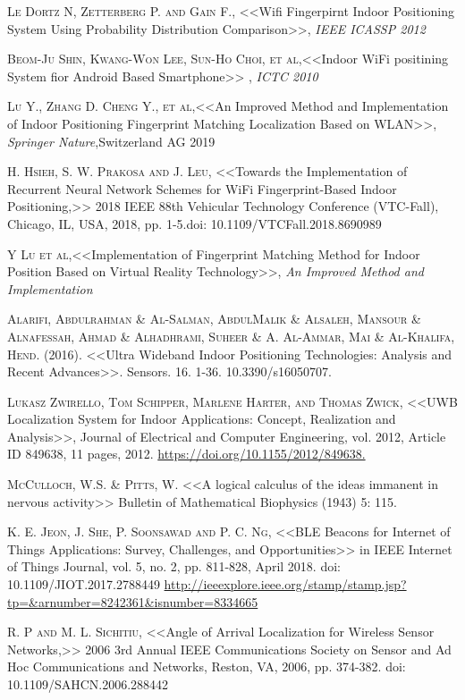\documentclass[12pt]{report}
\begin{document}
\begin{thebibliography}{X}
 \textsc{Le Dortz N, Zetterberg P. and Gain F.}, <<Wifi Fingerpirnt Indoor Positioning System Using Probability Distribution Comparison>>, \textit{IEEE ICASSP 2012}

 \textsc{Beom-Ju Shin, Kwang-Won Lee, Sun-Ho Choi, et al},<<Indoor WiFi positining System fior Android Based Smartphone>> , \textit{ICTC 2010}

 \textsc{Lu Y., Zhang D. Cheng Y., et al},<<An Improved Method and Implementation of Indoor Positioning Fingerprint Matching Localization Based on WLAN>>, \textit{Springer Nature},Switzerland AG 2019

\textsc{H. Hsieh, S. W. Prakosa and J. Leu}, <<Towards the Implementation of Recurrent Neural Network Schemes for WiFi Fingerprint-Based Indoor Positioning,>> 2018 IEEE 88th Vehicular Technology Conference (VTC-Fall), Chicago, IL, USA, 2018, pp. 1-5.doi: 10.1109/VTCFall.2018.8690989

 \textsc{Y Lu et al},<<Implementation of Fingerprint Matching Method for Indoor Position Based on Virtual Reality Technology>>, \textit{An Improved Method and Implementation}

 \textsc{Alarifi, Abdulrahman \& Al-Salman, AbdulMalik \& Alsaleh, Mansour \& Alnafessah, Ahmad \& Alhadhrami, Suheer \& A. Al-Ammar, Mai \& Al-Khalifa, Hend}. (2016). <<Ultra Wideband Indoor Positioning Technologies: Analysis and Recent Advances>>. Sensors. 16. 1-36. 10.3390/s16050707.

 \textsc{Lukasz Zwirello, Tom Schipper, Marlene Harter, and Thomas Zwick}, <<UWB Localization System for Indoor Applications: Concept, Realization and Analysis>>, Journal of Electrical and Computer Engineering, vol. 2012, Article ID 849638, 11 pages, 2012. \url{https://doi.org/10.1155/2012/849638.}

\textsc{McCulloch, W.S. \& Pitts, W.} <<A logical calculus of the ideas immanent in nervous activity>> Bulletin of Mathematical Biophysics (1943) 5: 115. 

 \textsc{K. E. Jeon, J. She, P. Soonsawad and P. C. Ng}, <<BLE Beacons for Internet of Things Applications: Survey, Challenges, and Opportunities>> in IEEE Internet of Things Journal, vol. 5, no. 2, pp. 811-828, April 2018. doi: 10.1109/JIOT.2017.2788449
\url{http://ieeexplore.ieee.org/stamp/stamp.jsp?tp=&arnumber=8242361&isnumber=8334665}

 \textsc{R. P and M. L. Sichitiu}, <<Angle of Arrival Localization for Wireless Sensor Networks,>> 2006 3rd Annual IEEE Communications Society on Sensor and Ad Hoc Communications and Networks, Reston, VA, 2006, pp. 374-382. doi: 10.1109/SAHCN.2006.288442


\end{thebibliography}
\end{document}
